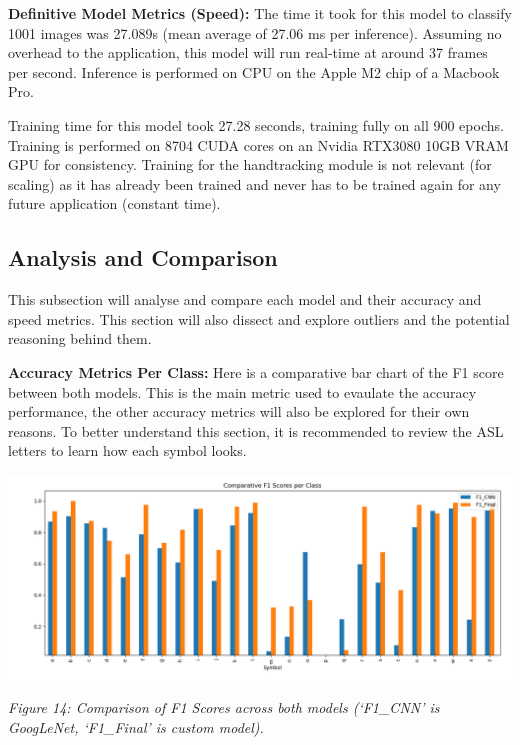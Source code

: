 \documentclass[11pt]{article}
\def\paraskip{\vskip 0.4cm}
\begin{document}
        \noindent\textbf{Definitive Model Metrics (Speed): }
        The time it took for this model to classify 1001 images was 27.089s (mean average of 27.06 ms per inference). Assuming no overhead to the application, this model will run real-time at around 37 frames per second. Inference is performed on CPU on the Apple M2 chip of a Macbook Pro.

        Training time for this model took 27.28 seconds, training fully on all 900 epochs. Training is performed on 8704 CUDA cores on an Nvidia RTX3080 10GB VRAM GPU for consistency. Training for the handtracking module is not relevant (for scaling) as it has already been trained and never has to be trained again for any future application (constant time).

    \subsection{Analysis and Comparison}
        This subsection will analyse and compare each model and their accuracy and speed metrics. This section will also dissect and explore outliers and the potential reasoning behind them.

        \paraskip

        \noindent\textbf{Accuracy Metrics Per Class: } Here is a comparative bar chart of the F1 score between both models. This is the main metric used to evaulate the accuracy performance, the other accuracy metrics will also be explored for their own reasons. To better understand this section, it is recommended to review the ASL letters to learn how each symbol looks.

        \begin{center}
            \includegraphics[width=16cm]{images/f1compare.png}
            \\
            \raggedright \textit{
            Figure 14: Comparison of F1 Scores across both models (`F1\_CNN' is GoogLeNet, `F1\_Final' is custom model).
            }
        \end{center}
\end{document}
